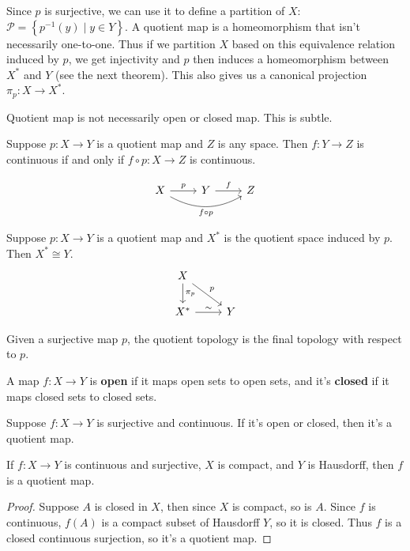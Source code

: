 \documentclass[twoside,10pt]{report}
\begin{document}
Since $p$ is surjective, we can use it to define a partition of $X$: $\mathcal{P} = \left\{ p^{-1}(y) \;|\; y \in Y \right\}.$ A quotient map is a homeomorphism that isn't necessarily one-to-one. Thus if we partition $X$ based on this equivalence relation induced by $p$, we get injectivity and $p$ then induces a homeomorphism between $X^{*}$ and $Y$ (see the next theorem). This also gives us a canonical projection $\pi_p:X\to X^{*}$.

{\color{red}Quotient map is not necessarily open or closed map. This is subtle.}

\begin{prop}
Suppose $p:X\to Y$ is a quotient map and $Z$ is any space. Then $f:Y\to Z$ is continuous if and only if $f \circ p:X \to Z$ is continuous.
\end{prop}
\[
\begin{tikzcd}
	X \rar{p}\arrow[rr,bend right,"f \circ p"'] & Y \rar{f} & Z
\end{tikzcd}
\] 

\begin{thrm}[]
Suppose $p:X\to Y$ is a quotient map and $X^{*}$ is the quotient space induced by $p$. Then $X^{*}\cong Y$.
\[
\begin{tikzcd}
	X\arrow[dr,"p"]\dar{\pi_p}\\
	X^{*}\rar{\sim}&Y
\end{tikzcd}
\] 
\end{thrm}

\begin{note}[]
	Given a surjective map $p$, the quotient topology is the final topology with respect to $p$.
\end{note}

\begin{defn}[]
A map $f:X\to Y$ is \textbf{open} if it maps open sets to open sets, and it's \textbf{closed} if it maps closed sets to closed sets.
\end{defn}

\begin{prop}
Suppose $f:X\to Y$ is surjective and continuous. If it's open or closed, then it's a quotient map.
\end{prop}

\begin{cor}
If $f:X\to Y$ is continuous and surjective, $X$ is compact, and $Y$ is Hausdorff, then $f$ is a quotient map.
\end{cor}
\begin{proof}
	Suppose $A$ is closed in $X$, then since $X$ is compact, so is $A$. Since $f$ is continuous, $f(A)$ is a compact subset of Hausdorff $Y$, so it is closed. Thus $f$ is a closed continuous surjection, so it's a quotient map.
\end{proof}
\end{document}
